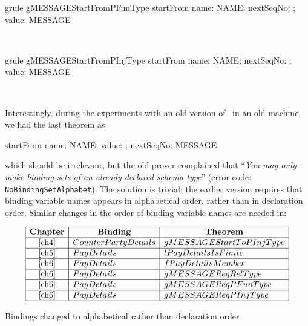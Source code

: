\begin{LGRT}
\begin{theorem}{grule gMESSAGEStartFromPFunType}
   startFrom \in  \lblot name: NAME; nextSeqNo: \nat ; value: \nat \rblot  \pfun  MESSAGE
\end{theorem}~\end{LGRT}

\begin{LGRT}
\begin{theorem}{grule gMESSAGEStartFromPInjType}
   startFrom \in \lblot name: NAME; nextSeqNo: \nat ;  value: \nat \rblot \pinj MESSAGE
\end{theorem}~\end{LGRT}
%
Interestingly, during the experiments with an old version of \zeves\ in an old machine,
we had the last theorem as
%
\begin{gzed}
  startFrom \in \lblot name: NAME; value: \nat; nextSeqNo: \nat \rblot \pinj MESSAGE
\end{gzed}
%
which should be irrelevant, but the old prover complained that ``\textit{You may only make binding sets of an already-declared schema type}''
(error code: \texttt{NoBindingSetAlphabet}). The solution is trivial: the earlier version requires that
binding variable names appears in alphabetical order, rather than in declaration order.
Similar changes in the order of binding variable names are needed in:
%
\begin{table}[ht]
\[
\begin{array}{|c|l|l|}
    \hline
    \multicolumn{1}{|c}{\mbox{\textbf{Chapter}}} & \multicolumn{1}{|c}{\mbox{\textbf{Binding}}} & \multicolumn{1}{|c|}{\mbox{\textbf{Theorem}}} \\
    \hline
    \ref{ch4}               & CounterPartyDetails     & gMESSAGEStartToPInjType \\
    \hline
    \ref{ch5}               & PayDetails              & lPayDetailsIsFinite \\
    \hline
    \ref{ch6}               & PayDetails              & fPayDetailsMember \\
    \hline
    \ref{ch6}               & PayDetails              & gMESSAGEReqRelType \\
    \hline
    \ref{ch6}               & PayDetails              & gMESSAGEReqPFunType \\
    \hline
    \ref{ch6}               & PayDetails              & gMESSAGEReqPInjType \\
    \hline
\end{array}
\]
\caption{Bindings changed to alphabetical rather than declaration order}
\end{table}

